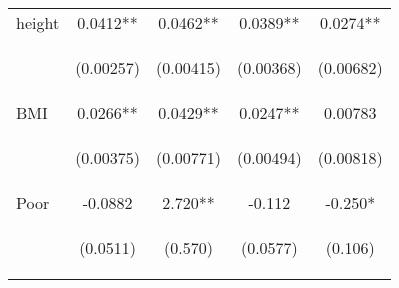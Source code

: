 \documentclass{article}[11pt,subeqn]
\begin{document}
\begin{spacing}{1.5}
\begin{table}[ht]
\begin{center}
\begin{tabular}{lcccc}
height & 0.0412** & 0.0462** & 0.0389** & 0.0274** \\
\vspace{4pt} & \begin{footnotesize}(0.00257)\end{footnotesize} & \begin{footnotesize}(0.00415)\end{footnotesize} & \begin{footnotesize}(0.00368)\end{footnotesize} & \begin{footnotesize}(0.00682)\end{footnotesize} \\
BMI & 0.0266** & 0.0429** & 0.0247** & 0.00783 \\
\vspace{4pt} & \begin{footnotesize}(0.00375)\end{footnotesize} & \begin{footnotesize}(0.00771)\end{footnotesize} & \begin{footnotesize}(0.00494)\end{footnotesize} & \begin{footnotesize}(0.00818)\end{footnotesize} \\
Poor & -0.0882 & 2.720** & -0.112 & -0.250* \\
\vspace{4pt} & \begin{footnotesize}(0.0511)\end{footnotesize} & \begin{footnotesize}(0.570)\end{footnotesize} & \begin{footnotesize}(0.0577)\end{footnotesize} & \begin{footnotesize}(0.106)\end{footnotesize} \\

\end{tabular}
\end{center}
\end{table}
\end{spacing}
\end{document}

